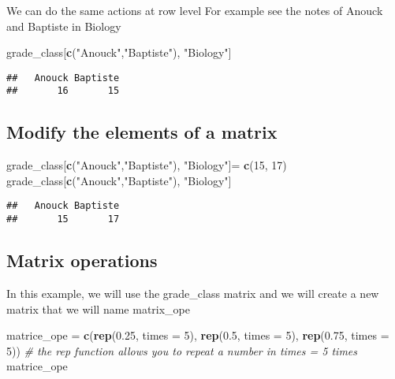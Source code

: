 \documentclass[
]{article}
\newenvironment{Shaded}{\begin{snugshade}}{\end{snugshade}}
\newcommand{\AttributeTok}[1]{\textcolor[rgb]{0.13,0.29,0.53}{#1}}
\newcommand{\CommentTok}[1]{\textcolor[rgb]{0.56,0.35,0.01}{\textit{#1}}}
\newcommand{\DecValTok}[1]{\textcolor[rgb]{0.00,0.00,0.81}{#1}}
\newcommand{\FloatTok}[1]{\textcolor[rgb]{0.00,0.00,0.81}{#1}}
\newcommand{\FunctionTok}[1]{\textcolor[rgb]{0.13,0.29,0.53}{\textbf{#1}}}
\newcommand{\NormalTok}[1]{#1}
\newcommand{\OtherTok}[1]{\textcolor[rgb]{0.56,0.35,0.01}{#1}}
\newcommand{\StringTok}[1]{\textcolor[rgb]{0.31,0.60,0.02}{#1}}
\begin{document}
We can do the same actions at row level For example see the notes of
Anouck and Baptiste in Biology

\begin{Shaded}
\begin{Highlighting}[]
\NormalTok{grade\_class[}\FunctionTok{c}\NormalTok{(}\StringTok{"Anouck"}\NormalTok{,}\StringTok{"Baptiste"}\NormalTok{), }\StringTok{"Biology"}\NormalTok{]}
\end{Highlighting}
\end{Shaded}

\begin{verbatim}
##   Anouck Baptiste 
##       16       15
\end{verbatim}

\hypertarget{modify-the-elements-of-a-matrix}{%
\subsection{Modify the elements of a
matrix}\label{modify-the-elements-of-a-matrix}}

\begin{Shaded}
\begin{Highlighting}[]
\NormalTok{grade\_class[}\FunctionTok{c}\NormalTok{(}\StringTok{"Anouck"}\NormalTok{,}\StringTok{"Baptiste"}\NormalTok{), }\StringTok{"Biology"}\NormalTok{]}\OtherTok{=} \FunctionTok{c}\NormalTok{(}\DecValTok{15}\NormalTok{, }\DecValTok{17}\NormalTok{)}
\NormalTok{grade\_class[}\FunctionTok{c}\NormalTok{(}\StringTok{"Anouck"}\NormalTok{,}\StringTok{"Baptiste"}\NormalTok{), }\StringTok{"Biology"}\NormalTok{]}
\end{Highlighting}
\end{Shaded}

\begin{verbatim}
##   Anouck Baptiste 
##       15       17
\end{verbatim}

\hypertarget{matrix-operations}{%
\subsection{Matrix operations}\label{matrix-operations}}

In this example, we will use the grade\_class matrix and we will create
a new matrix that we will name matrix\_ope

\begin{Shaded}
\begin{Highlighting}[]
\NormalTok{matrice\_ope }\OtherTok{=} \FunctionTok{c}\NormalTok{(}\FunctionTok{rep}\NormalTok{(}\FloatTok{0.25}\NormalTok{, }\AttributeTok{times =} \DecValTok{5}\NormalTok{), }\FunctionTok{rep}\NormalTok{(}\FloatTok{0.5}\NormalTok{, }\AttributeTok{times =} \DecValTok{5}\NormalTok{), }\FunctionTok{rep}\NormalTok{(}\FloatTok{0.75}\NormalTok{, }\AttributeTok{times =} \DecValTok{5}\NormalTok{)) }\CommentTok{\# the rep function allows you to repeat a number in times = 5 times}
\NormalTok{matrice\_ope}
\end{Highlighting}
\end{Shaded}
\end{document}
